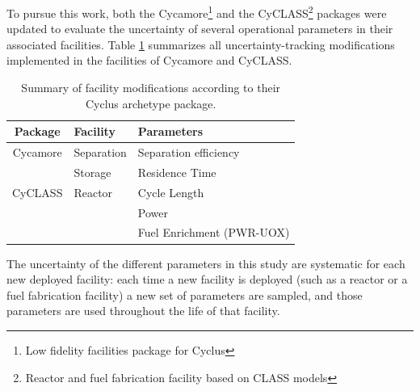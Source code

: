 \documentclass{anstrans}
\begin{document}
To pursue this work, both the Cycamore\footnote{Low
fidelity facilities package for Cyclus}\cite{cycamore} and the
CyCLASS\footnote{Reactor and fuel fabrication facility based on CLASS\cite{CLASS} models}\cite{mouginot_2018, cyclass} packages were
updated to evaluate the uncertainty of several
operational parameters in their associated facilities.  Table
\ref{tab:package_uncertainty} summarizes all uncertainty-tracking modifications implemented in the
facilities of Cycamore and CyCLASS.

\begin{table}[htb]
\centering
  \caption{Summary of facility modifications according to their Cyclus archetype package.}
\begin{tabular}{cl|l}
\toprule

Package   & Facility   & Parameters                \\
\midrule
Cycamore & Separation & Separation efficiency     \\\cmidrule{2-3} 
         & Storage    & Residence Time            \\
\midrule
CyCLASS  & Reactor    & Cycle Length              \\
         &            & Power                     \\
         &            & Fuel Enrichment (PWR-UOX) \\

\bottomrule
\end{tabular}

  \label{tab:package_uncertainty}
\end{table}

The uncertainty of the different parameters in this study
are systematic for each new deployed facility: each time a new facility is
deployed (such as a reactor or a fuel fabrication facility) a new set of
parameters are sampled, and those parameters are used throughout the life
of that facility.
\end{document}
